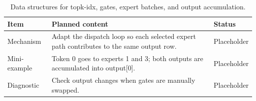 \begin{table}[H]
\centering
\caption{Data structures for topk-idx, gates, expert batches, and output accumulation.}
\label{tab:ch05-dispatch-for-two-expert-paths-per-token}
\begin{tabularx}{\textwidth}{p{}X p{}}
\toprule
Item & Planned content & Status \\
\midrule
Mechanism & Adapt the dispatch loop so each selected expert path contributes to the same output row. & Placeholder \\
Mini-example & Token 0 goes to experts 1 and 3; both outputs are accumulated into output[0]. & Placeholder \\
Diagnostic & Check output changes when gates are manually swapped. & Placeholder \\
\bottomrule
\end{tabularx}
\end{table}
